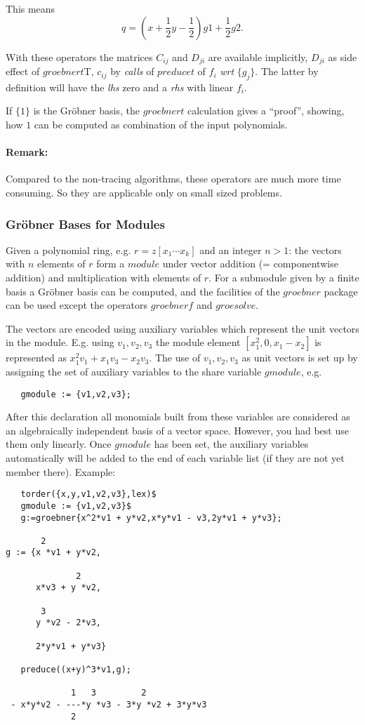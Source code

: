 This means
\[ q = ( x + \frac{1}{2} y - \frac{1}{2}) g1 + \frac{1}{2} g2.
\]

With these operators the matrices $C_{ij}$ and $D_{ji}$ are available
implicitly, $D_{ji}$ as side effect of $groebnert$T, $c_{ij}$ by {\it calls}
of $preducet$ of $f_i$ {\it wrt} $\{g_j\}$. The latter by definition will
have the {\it lhs} zero and a {\it rhs} with linear $f_i$.

If $\{1\}$ is the Gr\"obner basis, the $groebnert$ calculation gives
a ``proof'', showing,  how  $1$ can be computed as combination of the
input polynomials.

\paragraph{Remark:} Compared to the non-tracing algorithms, these
operators are much more time consuming. So they are applicable
only on small sized problems.

\subsubsection{Gr\"obner Bases for Modules}

Given a polynomial ring, e.g. $r=z[x_1 \cdots x_k]$ and
an integer $n>1$: the vectors with $n$ elements of $r$
form a $module$ under vector addition (= componentwise addition)
and multiplication with elements of $r$. For a submodule
given by a finite basis a Gr\"obner basis
can be computed, and the facilities of the $groebner$ package
can be used except the operators $groebnerf$ and $groesolve$.

The vectors are encoded using auxiliary variables which represent
the unit vectors in the module. E.g. using ${v_1,v_2,v_3}$ the
module element $[x_1^2,0,x_1-x_2]$ is represented as
$x_1^2 v_1 + x_1 v_3 - x_2 v_3$. The use of ${v_1,v_2,v_3}$
as unit vectors is set up by assigning the set of auxiliary variables
to the share variable $gmodule$, e.g.
\begin{verbatim}
   gmodule := {v1,v2,v3};
\end{verbatim}
After this declaration all monomials built from these variables
are considered as an algebraically independent basis of a vector
space. However, you had best use them only linearly. Once $gmodule$
has been set, the auxiliary variables automatically will be
added to the end of each variable list (if they are not yet
member there).
Example:
\begin{verbatim}
   torder({x,y,v1,v2,v3},lex)$
   gmodule := {v1,v2,v3}$
   g:=groebner{x^2*v1 + y*v2,x*y*v1 - v3,2y*v1 + y*v3};

       2
g := {x *v1 + y*v2,

              2
      x*v3 + y *v2,

       3
      y *v2 - 2*v3,

      2*y*v1 + y*v3}

   preduce((x+y)^3*v1,g);

             1   3         2
 - x*y*v2 - ---*y *v3 - 3*y *v2 + 3*y*v3
             2

\end{verbatim}

